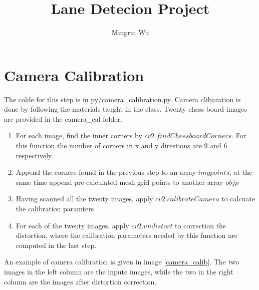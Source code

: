 \documentclass[12pt]{article}
\title{Lane Detecion Project}
\author{Mingrui Wu}
\date{}
\begin{document}
\maketitle


\section{Camera Calibration}
The colde for this step is in py/camera\_calibration.py. Camera clibaration is done by following the materials taught in the class. Twenty chess board images are provided in the camera\_cal folder. 
\begin{enumerate}
	\item For each image, find the inner corners by $cv2.findChessboardCorners$. For this function the number of corners in x and y direstions are 9 and 6 respectively.
	\item Append the corners found in the previous step to an array $imgpoints$, at the same time append pre-calculated mesh grid points to another array $objp$
	\item Having scanned all the twenty images, apply $cv2.calibrateCamera$ to calcuate the calibration paramters
	\item For each of the twenty images, apply $cv2.undistort$ to correction the distortion, where the calibration parameters needed by this function are computed in the last step.
\end{enumerate}
	 
An example of camera calibration is given in image \ref{camera_calib}. The two images in the left column are the inpute images, while the two in the right column are the images after distortion correction.
\end{document}
